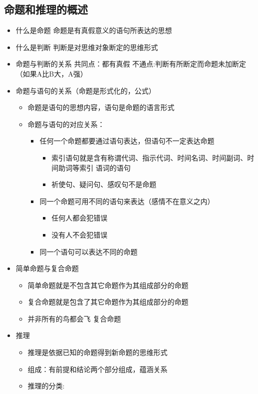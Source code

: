 \documentclass[11pt]{article}
\begin{document}
\subsection{命题和推理的概述}
\label{sec-4-1}
\begin{itemize}
\item 什么是命题
命题是有真假意义的语句所表达的思想
\item 什么是判断
判断是对思维对象断定的思维形式
\item 命题与判断的关系
共同点：都有真假
不通点:判断有所断定而命题未加断定（如果A比B大，A强）
\item 命题与语句的关系（命题是形式化的，公式）
\begin{itemize}
\item 命题是语句的思想内容，语句是命题的语言形式
\item 命题与语句的对应关系：
\begin{itemize}
\item 任何一个命题都要通过语句表达，但语句不一定表达命题
\begin{itemize}
\item 索引语句就是含有称谓代词、指示代词、时间名词、时间副词、时间助词等索引
语词的语句
\item 祈使句、疑问句、感叹句不是命题
\end{itemize}
\item 同一个命题可用不同的语句来表达（感情不在意义之内）
\begin{itemize}
\item 任何人都会犯错误
\item 没有人不会犯错误
\end{itemize}
\item 同一个语句可以表达不同的命题
\end{itemize}
\end{itemize}
\item 简单命题与复合命题
\begin{itemize}
\item 简单命题就是不包含其它命题作为其组成部分的命题
\item 复合命题就是包含了其它命题作为其组成部分的命题
\item 并非所有的鸟都会飞 复合命题
\end{itemize}
\item 推理
\begin{itemize}
\item 推理是依据已知的命题得到新命题的思维形式
\item 组成：有前提和结论两个部分组成，蕴涵关系
\item 推理的分类:

\end{itemize}
\end{itemize}
\end{document}
